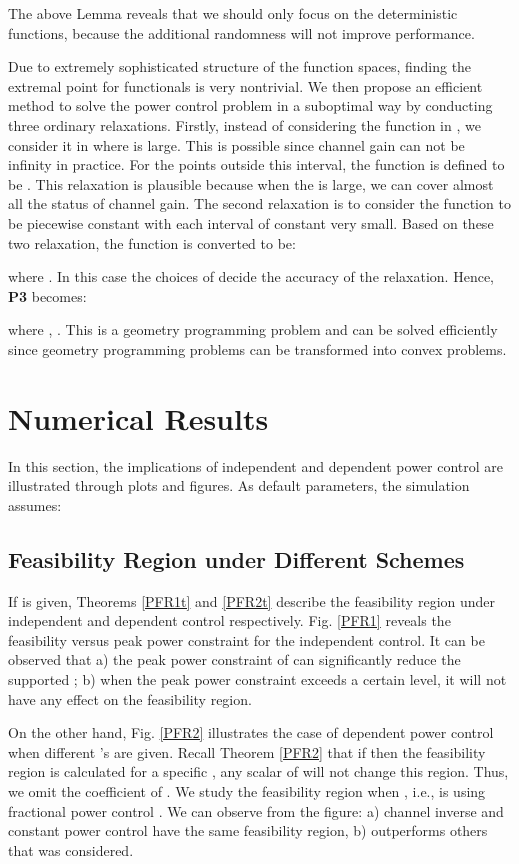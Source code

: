 \documentclass[12pt, draftclsnofoot, journal, letterpaper, onecolumn]{IEEEtran}
\begin{document}
The above Lemma reveals that we should only focus on the deterministic functions, because the additional randomness will not improve performance.

Due to extremely sophisticated structure of the function spaces, finding the extremal point for functionals is very nontrivial. We then propose an efficient method to solve the power control problem in a suboptimal way by conducting three ordinary relaxations. Firstly, instead of considering the function  in , we consider it in  where  is large. This is possible since channel gain can not be infinity in practice. For the points outside this interval, the function is defined to be . This relaxation is plausible because when the  is large, we can cover almost all the status of channel gain. The second relaxation is to consider the function to be piecewise constant with each interval of constant very small. Based on these two relaxation, the function is converted to be:

where . In this case the choices of  decide the accuracy of the relaxation.
Hence, \textbf{P3} becomes:

where , . This is a geometry programming problem and can be solved efficiently since geometry programming problems can be transformed into convex problems.
\section{Numerical Results}
In this section, the implications of independent and dependent power control are illustrated through plots and figures. As default parameters, the simulation assumes:

\subsection{Feasibility Region under Different Schemes}

If  is given, Theorems \ref{PFR1t} and \ref{PFR2t} describe the feasibility region under independent and dependent control respectively.  Fig. \ref{PFR1} reveals the feasibility versus peak power constraint for the independent control. It can be observed that a) the peak power constraint of  can significantly reduce the supported ; b) when the peak power constraint exceeds a certain level, it will not have any effect on the feasibility region.

On the other hand, Fig. \ref{PFR2} illustrates the case of dependent power control when different 's are given. Recall Theorem \ref{PFR2} that if then the feasibility region is calculated for a specific , any scalar of  will not change this region. Thus, we omit the coefficient of . We study the feasibility region when , i.e.,  is using fractional power control \cite{FPC}. We can observe from the figure: a) channel inverse and constant power control have the same feasibility region, b)  outperforms others that was considered.
\end{document}
